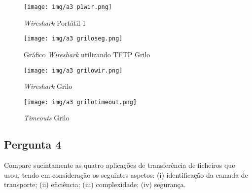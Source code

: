 \documentclass[runningheads]{llncs}
\begin{document}
    \begin{figure}[!ht]
    \centering
    \texttt{[image: img/a3 p1wir.png]}
    \caption{\textit{Wireshark} Portátil 1} 
    \label{fig:data34}
    \end{figure}
    
    \begin{figure}[!ht]
    \centering
    \texttt{[image: img/a3 griloseg.png]}
    \caption{Gráfico \textit{Wireshark} utilizando TFTP Grilo} 
    \label{fig:data34}
    \end{figure}
    
    \begin{figure}[!ht]
    \centering
    \texttt{[image: img/a3 grilowir.png]}
    \caption{\textit{Wireshark} Grilo} 
    \label{fig:data34}
    \end{figure}
    
    \begin{figure}[!ht]
    \centering
    \texttt{[image: img/a3 grilotimeout.png]}
    \caption{\textit{Timeouts} Grilo} 
    \label{fig:data34}
    \end{figure}
    
    \pagebreak
    \paragraph{}
    \paragraph{}
    \paragraph{}
    \paragraph{}
    \paragraph{}
    \subsection{Pergunta 4}
    Compare sucintamente as quatro aplicações de transferência de ficheiros que usou, tendo em consideração os seguintes aspetos: (i) identificação da camada de transporte; (ii) eficiência; (iii) complexidade; (iv) segurança.
    
    \bigskip
    
\end{document}
